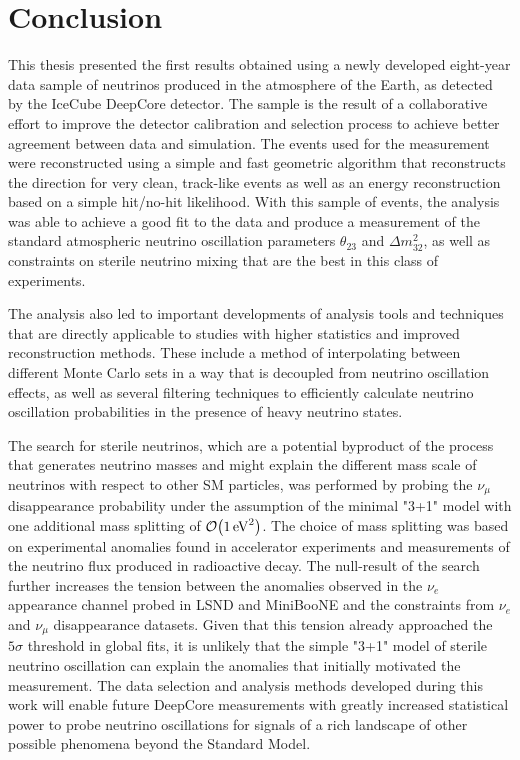 \chapter{Conclusion}

This thesis presented the first results obtained using a newly developed eight-year data sample of neutrinos produced in the atmosphere of the Earth, as detected by the IceCube DeepCore detector. The sample is the result of a collaborative effort to improve the detector calibration and selection process to achieve better agreement between data and simulation. The events used for the measurement were reconstructed using a simple and fast geometric algorithm that reconstructs the direction for very clean, track-like events as well as an energy reconstruction based on a simple hit/no-hit likelihood. With this sample of events, the analysis was able to achieve a good fit to the data and produce a measurement of the standard atmospheric neutrino oscillation parameters $\theta_{23}$ and $\Delta m^2_{32}$, as well as constraints on sterile neutrino mixing that are the best in this class of experiments.

The analysis also led to important developments of analysis tools and techniques that are directly applicable to studies with higher statistics and improved reconstruction methods. These include a method of interpolating between different Monte Carlo sets in a way that is decoupled from neutrino oscillation effects, as well as several filtering techniques to efficiently calculate neutrino oscillation probabilities in the presence of heavy neutrino states.

The search for sterile neutrinos, which are a potential byproduct of the process that generates neutrino masses and might explain the different mass scale of neutrinos with respect to other SM particles, was performed by probing the $\nu_\mu$ disappearance probability under the assumption of the minimal "3+1" model with one additional mass splitting of $\order{\SI{1}{\electronvolt\squared}}$. The choice of mass splitting was based on experimental anomalies found in accelerator experiments and measurements of the neutrino flux produced in radioactive decay. The null-result of the search further increases the tension between the anomalies observed in the $\nu_e$ appearance channel probed in LSND and MiniBooNE and the constraints from $\nu_e$ and $\nu_\mu$ disappearance datasets. Given that this tension already approached the $5\sigma$ threshold in global fits, it is unlikely that the simple "3+1" model of sterile neutrino oscillation can explain the anomalies that initially motivated the measurement. The data selection and analysis methods developed during this work will enable future DeepCore measurements with greatly increased statistical power to probe neutrino oscillations for signals of a rich landscape of other possible phenomena beyond the Standard Model.
